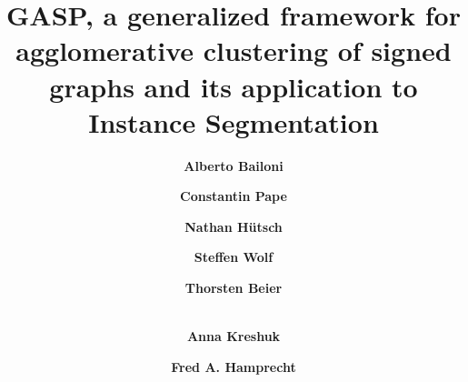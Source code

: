 \documentclass[10pt,twocolumn,letterpaper]{article}
\theoremstyle{definition}
\theoremstyle{remark}
\begin{document}
\title{GASP, a generalized framework for agglomerative clustering of signed graphs and its application to Instance Segmentation} %




\author[1]{\textbf{Alberto Bailoni}}
\author[1,2]{\textbf{Constantin Pape}}
\author[1]{\textbf{Nathan H\"utsch}}
\author[1]{\textbf{Steffen Wolf}}
\author[2]{\textbf{Thorsten Beier}}
\author[2]{\\\textbf{Anna Kreshuk}}
\author[1]{\textbf{Fred A. Hamprecht}}
\renewcommand\Authands{, }

\maketitle
\ificcvfinal\thispagestyle{empty}\fi











% 



{\small


}

\clearpage


    
\end{document}
